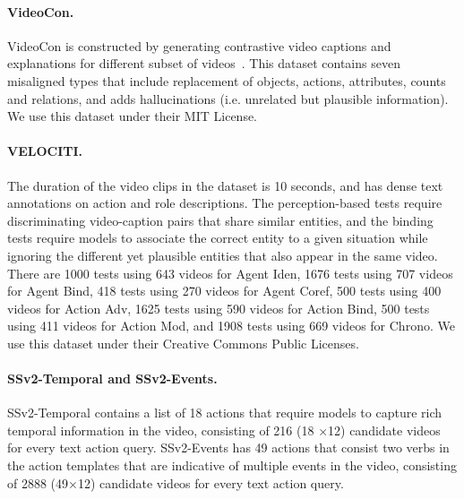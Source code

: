 \paragraph{VideoCon.}
VideoCon is constructed by generating contrastive video captions and explanations for different subset of videos~\cite{Xu2016MSRVTTAL, wang2019vatex, hendricks-etal-2018-localizing}. 
This dataset contains seven misaligned types that include replacement of objects, actions, attributes, counts and relations, and adds hallucinations (i.e. unrelated but plausible information). We use this dataset under their MIT License.

\paragraph{VELOCITI.}
The duration of the video clips in the dataset is 10 seconds, and has dense text annotations on action and role descriptions.
The perception-based tests require discriminating video-caption pairs that share similar entities, and the binding tests require models to associate the correct entity to a given situation while ignoring the different yet plausible entities that also appear in the same video.
There are 1000 tests using 643 videos for Agent Iden, 1676 tests using 707 videos for Agent Bind, 418 tests using 270 videos for Agent Coref, 500 tests using 400 videos for Action Adv, 1625 tests using 590 videos for Action Bind, 500 tests using 411 videos for Action Mod, and 1908 tests using 669 videos for Chrono.  
We use this dataset under their Creative Commons Public Licenses.

\paragraph{SSv2-Temporal and SSv2-Events.}
SSv2-Temporal contains a list of 18 actions that require models to capture rich temporal information in the video, consisting of 216 (18 ×12) candidate videos for every text
action query.
SSv2-Events has 49 actions that consist two verbs in the action templates that are indicative of multiple events in the video,  consisting of 2888 (49×12) candidate videos for
every text action query.
